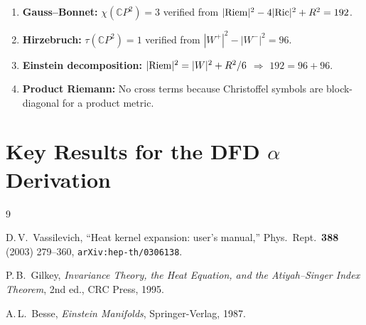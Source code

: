 \documentclass[11pt,a4paper]{article}
\begin{document}
\begin{enumerate}
\item \textbf{Gauss--Bonnet:} $\chi(\mathbb{C}P^2) = 3$ verified from
$|{\rm Riem}|^2 - 4|{\rm Ric}|^2 + R^2 = 192$.
\item \textbf{Hirzebruch:} $\tau(\mathbb{C}P^2) = 1$ verified from
$|W^+|^2 - |W^-|^2 = 96$.
\item \textbf{Einstein decomposition:} $|{\rm Riem}|^2 = |W|^2 + R^2/6$
$\Rightarrow$ $192 = 96 + 96$. \checkmark
\item \textbf{Product Riemann:} No cross terms because Christoffel symbols
are block-diagonal for a product metric.
\end{enumerate}


\section{Key Results for the DFD $\alpha$ Derivation}

\begin{center}
\end{center}


\begin{thebibliography}{9}

D.\,V.~Vassilevich,
``Heat kernel expansion: user's manual,''
Phys.\ Rept.\ \textbf{388} (2003) 279--360,
\texttt{arXiv:hep-th/0306138}.

P.\,B.~Gilkey,
\textit{Invariance Theory, the Heat Equation, and the Atiyah--Singer
Index Theorem},
2nd ed., CRC Press, 1995.

A.\,L.~Besse,
\textit{Einstein Manifolds},
Springer-Verlag, 1987.

\end{thebibliography}
\end{document}
